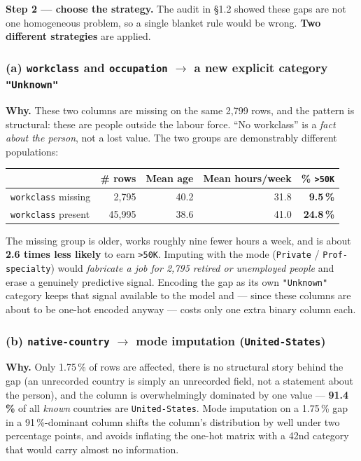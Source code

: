 \documentclass[11pt,a4paper]{article}
\newcommand{\code}[1]{\texttt{\small #1}}
\begin{document}
\noindent
\textbf{Step 2 --- choose the strategy.} The audit in \S1.2 showed these gaps are not one
homogeneous problem, so a single blanket rule would be wrong. \textbf{Two different
strategies} are applied.

\subsubsection*{(a) \code{workclass} and \code{occupation} $\to$ a new explicit category \code{"Unknown"}}

\textbf{Why.} These two columns are missing on the same 2{,}799 rows, and the pattern is
structural: these are people outside the labour force. ``No workclass'' is a \emph{fact
about the person}, not a lost value. The two groups are demonstrably different populations:

\begin{table}[H]
\centering
\small
\begin{tabular}{lrrrr}
\toprule
& \textbf{\# rows} & \textbf{Mean age} & \textbf{Mean hours/week} & \textbf{\% \code{>50K}} \\
\midrule
\code{workclass} missing & 2{,}795  & 40.2 & 31.8 & \textbf{9.5\,\%} \\
\code{workclass} present & 45{,}995 & 38.6 & 41.0 & \textbf{24.8\,\%} \\
\bottomrule
\end{tabular}
\end{table}

\noindent
The missing group is older, works roughly nine fewer hours a week, and is about
\textbf{2.6 times less likely} to earn \code{>50K}. Imputing with the mode
(\code{Private} / \code{Prof-specialty}) would \emph{fabricate a job for 2{,}795 retired or
unemployed people} and erase a genuinely predictive signal. Encoding the gap as its own
\code{"Unknown"} category keeps that signal available to the model and --- since these
columns are about to be one-hot encoded anyway --- costs only one extra binary column each.

\subsubsection*{(b) \code{native-country} $\to$ mode imputation (\code{United-States})}

\textbf{Why.} Only 1.75\,\% of rows are affected, there is no structural story behind the
gap (an unrecorded country is simply an unrecorded field, not a statement about the
person), and the column is overwhelmingly dominated by one value --- \textbf{91.4\,\%} of
all \emph{known} countries are \code{United-States}. Mode imputation on a 1.75\,\% gap in a
91\,\%-dominant column shifts the column's distribution by well under two percentage
points, and avoids inflating the one-hot matrix with a 42nd category that would carry
almost no information.
\end{document}
